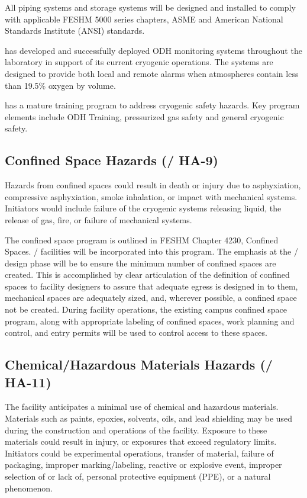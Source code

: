 All piping systems and storage systems will be designed and installed
to comply with applicable FESHM 5000 series chapters, ASME and
American National Standards Institute (ANSI) standards.

\fnal has developed and successfully deployed ODH monitoring systems throughout the laboratory in support of its current cryogenic operations. The systems are designed to provide both local and remote alarms when atmospheres contain less than 19.5\% oxygen by volume.

\fnal has a mature training program to address cryogenic safety
hazards. Key program elements include ODH Training, pressurized gas
safety and general cryogenic safety.


\subsection{Confined Space Hazards (/ HA-9)}

Hazards from confined spaces could result in death or injury due to
asphyxiation, compressive asphyxiation, smoke inhalation, or impact
with mechanical systems. Initiators would include failure of the
cryogenic systems releasing liquid, the release of gas, fire, or
failure of mechanical systems.

The \fnal confined space program is outlined in FESHM Chapter 4230,
Confined Spaces. / facilities will be incorporated into this
program. The emphasis at the / design phase will be to ensure
the minimum number of confined spaces are created. This is
accomplished by clear articulation of the definition of confined
spaces to facility designers to assure that adequate egress is
designed in to them, mechanical spaces are adequately sized, and,
wherever possible, a confined space not be created. During facility
operations, the existing campus confined space program, along with
appropriate labeling of confined spaces, work planning and control,
and entry permits will be used to control access to these spaces.


\subsection{Chemical/Hazardous Materials Hazards (/ HA-11)}

The  facility anticipates a minimal use of chemical and hazardous
materials. Materials such as paints, epoxies, solvents, oils, and lead
shielding may be used during the construction and operations of the
facility. Exposure to these materials could result in injury, or
exposures that exceed regulatory limits. Initiators could be
experimental operations, transfer of material, failure of packaging,
improper marking/labeling, reactive or explosive event, improper
selection of or lack of, personal protective equipment (PPE), or a
natural phenomenon.

